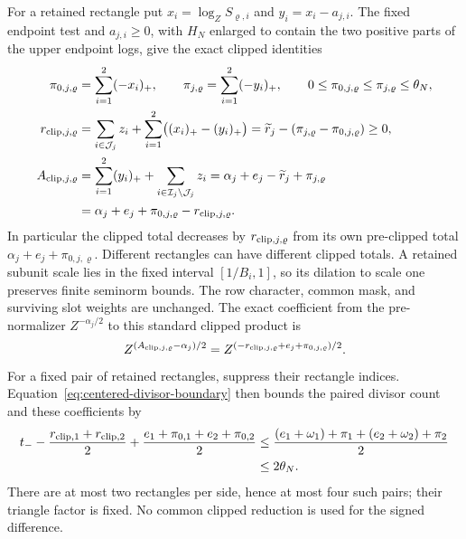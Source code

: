 \documentclass[12pt]{article}
\begin{document}
For a retained rectangle put
\(x_i=\log_ZS_{\varrho,i}\) and \(y_i=x_i-a_{j,i}\).  The fixed
endpoint test and \(a_{j,i}\ge0\), with \(H_N\) enlarged to contain
the two positive parts of the upper endpoint logs, give the exact clipped identities
\begin{equation}
 \begin{aligned}
 \pi_{0,j,\varrho}&=\sum_{i=1}^2(-x_i)_+,\qquad
 \pi_{j,\varrho}=\sum_{i=1}^2(-y_i)_+,
 \qquad 0\le\pi_{0,j,\varrho}\le\pi_{j,\varrho}\le\theta_N,\\
 r_{{\rm clip},j,\varrho}
 &=\sum_{i\in\mathcal J_j}z_i+
       \sum_{i=1}^2\bigl((x_i)_+-(y_i)_+\bigr)
 =\widetilde r_j-(\pi_{j,\varrho}-\pi_{0,j,\varrho})\ge0,\\
 A_{{\rm clip},j,\varrho}
 &=\sum_{i=1}^2(y_i)_++\sum_{i\in\mathcal I_j\setminus\mathcal J_j}z_i
 =\alpha_j+e_j-\widetilde r_j+\pi_{j,\varrho}\\
 &=\alpha_j+e_j+\pi_{0,j,\varrho}-r_{{\rm clip},j,\varrho}.
 \end{aligned}
 \label{eq:centered-clipped-rectangle}
\end{equation}
In particular the clipped total decreases by \(r_{{\rm clip},j,\varrho}\)
from its own pre-clipped total \(\alpha_j+e_j+\pi_{0,j,\varrho}\).
Different rectangles can have different clipped totals.  A retained
subunit scale lies in the fixed interval \([1/B_i,1]\), so its dilation
to scale one preserves finite seminorm bounds.  The row character, common
mask, and surviving slot weights are unchanged.  The exact coefficient
from the pre-normalizer \(Z^{-\alpha_j/2}\) to this standard clipped
product is
\[
 Z^{(A_{{\rm clip},j,\varrho}-\alpha_j)/2}
 =Z^{(-r_{{\rm clip},j,\varrho}+e_j+\pi_{0,j,\varrho})/2}.
\]
For a fixed pair of retained rectangles, suppress their rectangle indices.
Equation~\eqref{eq:centered-divisor-boundary} then bounds the paired
divisor count and these coefficients by
\begin{equation}
 \begin{split}
 t_- -\frac{r_{{\rm clip},1}+r_{{\rm clip},2}}2
     +\frac{e_1+\pi_{0,1}+e_2+\pi_{0,2}}2
 &\le\frac{(e_1+\omega_1)+\pi_1+(e_2+\omega_2)+\pi_2}{2}\\
 &\le2\theta_N.
 \end{split}
 \label{eq:centered-clipped-shell}
\end{equation}
There are at most two rectangles per side, hence at most four such pairs;
their triangle factor is fixed.  No common clipped reduction is used for
the signed difference.
\end{document}
